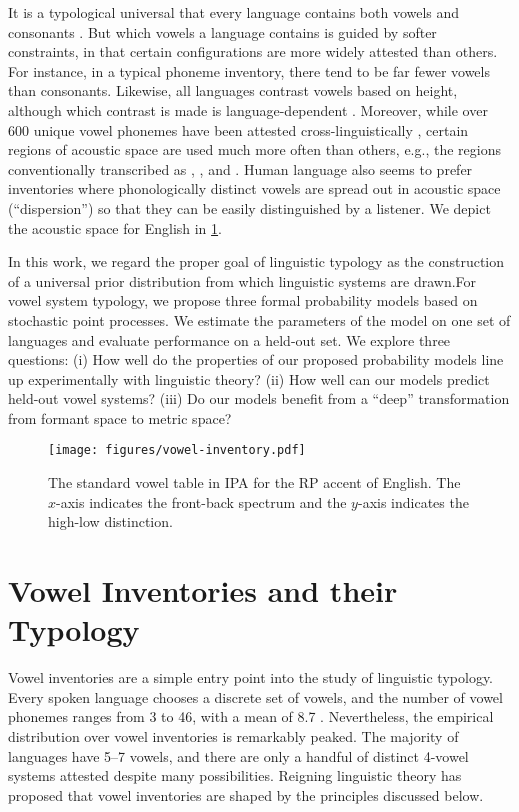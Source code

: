 \documentclass[11pt,a4paper]{article}
\renewcommand{\cite}[2][]{\citep[#1]{#2}}
\newcommand{\phone}[1]{\textipa{[#1]}}
\begin{document}
It is a typological universal that every language contains both vowels
and consonants \cite{velupillai2012introduction}.  But which vowels a
language contains is guided by softer constraints, in that certain
configurations are more widely attested than others. For instance, in
a typical phoneme inventory, there tend to be far fewer vowels than
consonants. Likewise, all languages contrast vowels based on height,
although which contrast is made is language-dependent
\cite{ladefoged1998sounds}. Moreover, while over 600 unique vowel
phonemes have been
attested cross-linguistically \cite{moran2014phoible}, certain regions
of acoustic space are used much more often than others, e.g., the
regions conventionally transcribed as \phone{a}, \phone{i}, and \phone{u}. Human
language also seems to prefer inventories where phonologically
distinct vowels are spread out in acoustic space (``dispersion'') 
so that they can be easily distinguished by a listener. We
depict the acoustic space for English in \cref{fig:diagram}.

In this work, we regard the proper goal of linguistic typology as the
construction of a universal prior distribution from which linguistic
systems are drawn.For vowel system typology, we propose
three formal probability models based on stochastic point processes.
We estimate the parameters of the model on one set of
languages and evaluate performance on a held-out set. We explore three
questions: (i) How well do the properties of our proposed probability
models line up experimentally with linguistic theory? (ii) How well
can our models predict held-out vowel systems? (iii) Do our models
benefit from a ``deep'' transformation from formant space to
metric space?

\begin{figure}
  \centering
  \texttt{[image: figures/vowel-inventory.pdf]}
  \caption{The standard vowel table in IPA for the RP accent of English. The $x$-axis indicates the front-back spectrum
    and the $y$-axis indicates the high-low distinction.}
  \label{fig:diagram}
\end{figure}

\section{Vowel Inventories and their Typology}\label{sec:vowel-inventories}
Vowel inventories are a simple entry point into the study of linguistic typology. Every spoken language chooses a discrete set of vowels, and the number of vowel phonemes ranges from 3 to 46, with a mean of 8.7 \cite{gordon}. Nevertheless, the empirical distribution over vowel inventories is remarkably peaked.  The majority of languages have 5--7 vowels, and there are only a handful of distinct 4-vowel systems attested despite many possibilities. Reigning linguistic theory \cite{becker2010acoustic} has proposed that vowel inventories are shaped by the principles discussed below.
\end{document}
